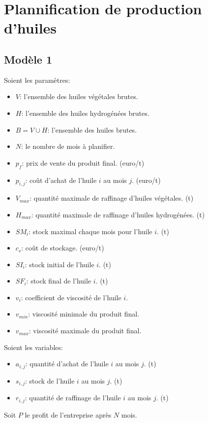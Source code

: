 \documentclass[10pt,a4paper]{article}
\begin{document}
\section{Plannification de production d'huiles}

\subsection{Modèle 1}
Soient les paramètres:
\begin{itemize}
    \item $V$: l'ensemble des huiles végétales brutes.
    \item $H$: l'ensemble des huiles hydrogénées brutes.
    \item $B = V \cup H$: l'ensemble des huiles brutes.
    \item $N$: le nombre de mois à planifier.
    \item $p_f$: prix de vente du produit final. (euro/t)
    \item $p_{i,j}$: coût d'achat de l'huile $i$ au mois $j$. (euro/t)
    \item $V_{max}$: quantité maximale de raffinage d'huiles végétales. (t)
    \item $H_{max}$: quantité maximale de raffinage d'huiles hydrogénées. (t)
    \item $SM_i$: stock maximal chaque mois pour l'huile $i$. (t)
    \item $c_s$: coût de stockage. (euro/t)
    \item $SI_i$: stock initial de l'huile $i$. (t)
    \item $SF_i$: stock final de l'huile $i$. (t)
    \item $v_i$: coefficient de viscosité de l'huile $i$.
    \item $v_{min}$: viscosité minimale du produit final.
    \item $v_{max}$: viscosité maximale du produit final.
\end{itemize}

Soient les variables:
\begin{itemize}
    \item $a_{i,j}$: quantité d'achat de l'huile $i$ au mois $j$. (t)
    \item $s_{i,j}$: stock de l'huile $i$ au mois $j$. (t)
    \item $r_{i,j}$: quantité de raffinage de l'huile $i$ au mois $j$. (t)
\end{itemize}

Soit $P$ le profit de l'entreprise après $N$ mois.
\end{document}
